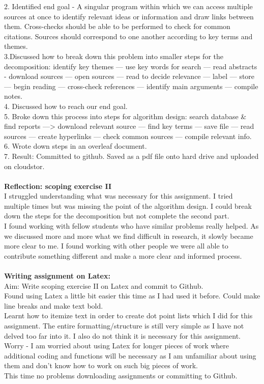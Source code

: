 \documentclass{article}
\begin{document}
2. Identified end goal - A singular program within which we can access multiple sources at once to identify relevant ideas or information and draw links between them. Cross-checks should be able to be performed to check for common citations. Sources should correspond to one another according to key terms and themes.\\
3.Discussed how to break down this problem into smaller steps for the decomposition: identify key themes — use key words for search — read abstracts - download sources — open sources — read to decide relevance — label — store — begin reading — cross-check references — identify main arguments — compile notes. \\
4. Discussed how to reach our end goal.\\
5. Broke down this process into steps for algorithm design: search database & find reports —> download relevant source — find key terms — save file — read sources — create hyperlinks — check common sources — compile relevant info.\\
6. Wrote down steps in an overleaf document.\\
7. Result: Committed to github. Saved as a pdf file onto hard drive and uploaded on cloudstor.\\ 
\\
\textbf{Reflection: scoping exercise II}\\
I struggled understanding what was necessary for this assignment. I tried multiple times but was missing the point of the algorithm design. I could break down the steps for the decomposition but not complete the second part.\\
I found working with fellow students who have similar problems really helped. As we discussed more and more what we find difficult in research, it slowly became more clear to me. I found working with other people we were all able to contribute something different and make a more clear and informed process.\\
\\
\textbf{Writing assignment on Latex:}\\
Aim: Write scoping exercise II on Latex and commit to Github.\\
Found using Latex a little bit easier this time as I had used it before. Could make line breaks and make text bold.\\
Learnt how to itemize text in order to create dot point lists which I did for this assignment.
The entire formatting/structure is still very simple as I have not delved too far into it. I also do not think it is necessary for this assignment.\\
Worry - I am worried about using Latex for longer pieces of work where additional coding and functions will be necessary as I am unfamiliar about using them and don’t know how to work on such big pieces of work. \\
This time no problems downloading assignments or committing to Github.
\end{document}
